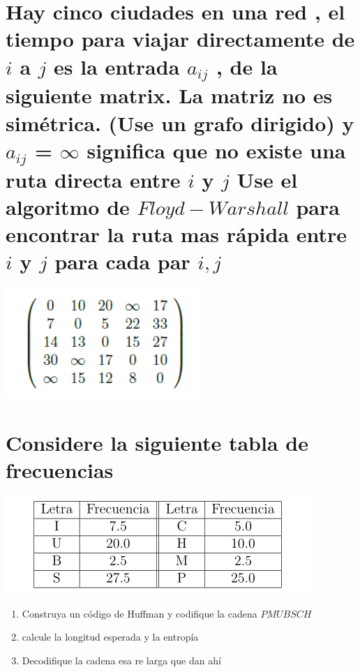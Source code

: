 \documentclass[10pt,a4paper]{article} %
\begin{document}

        \section{Hay cinco ciudades en una red , el tiempo para viajar
        directamente de $i$ a $j$ es la entrada $a_{ij}$ , de la siguiente
        matrix. La matriz no es simétrica. (Use un grafo dirigido) y $a_{ij}$ =
        $\infty$ significa que no existe una ruta directa entre $i$ y $j$ Use el
        algoritmo de $Floyd-Warshall$ para encontrar la ruta mas rápida entre $i$ y $j$
        para cada par $i,j$  }
            \begin{center}
                \includegraphics[width=0.4\linewidth]{matrixp11.png}
            \end{center}




        \section{Considere la siguiente tabla de frecuencias}
            \begin{center}
                \includegraphics[width=0.4\linewidth]{tabfrec12.png}
            \end{center}

            \begin{enumerate}
                \item {Construya un código de Huffman y codifique la cadena $PMUBSCH$}
                \item {calcule la longitud esperada y la entropía}
                \item {Decodifique la cadena esa re larga que dan ahí}
            \end{enumerate}
\end{document}
